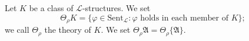 Let $K$ be a class of $\mathcal{L}$-structures. We set
$$\Theta_{\rho}K = \{\varphi \in \text{Sent}_{\mathcal{L}} : \varphi \text{ holds in each member of } K\};$$
we call $\Theta_{\rho}$ the theory of $K$. We set $\Theta_{\rho}\mathfrak{A} = \Theta_{\rho}\{\mathfrak{A}\}$.
